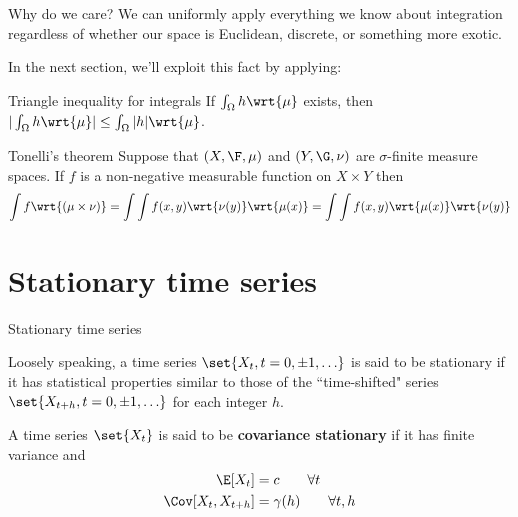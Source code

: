 \documentclass[10pt]{beamer}
\newcommand{\dmu}{\wrt{\mu}}
\begin{document}
\begin{frame}{Why do we care?}
We can uniformly apply everything we know about integration regardless of whether our space is Euclidean, discrete, or something more exotic.

In the next section, we'll exploit this fact by applying:

\vfill 
\begin{block}{Triangle inequality for integrals}
If $\int_\Omega h \dmu$ exists, then $|\int_\Omega h \dmu| \leq \int_\Omega |h| \dmu$.	
\end{block}

\vfill 

\begin{block}{Tonelli's theorem}
 Suppose that $(X,\F,\mu)$ and $(Y, \G, \nu)$ are $\sigma$-finite measure spaces.   If $f$ is a \alert{non-negative} measurable function on $X \times Y$ then
%
\begin{align*}
\int f \wrt{(\mu \times \nu)} = \int \int f(x,y) \wrt{\nu(y)}   \wrt{\mu(x)}  = \int \int f(x,y) \wrt{\mu(x)}  \wrt{\nu(y)}   
\end{align*}
\end{block}
\end{frame}

\section{Stationary time series}

\begin{frame}{Stationary time series}

Loosely speaking, a time series $\set{X_t, t=0, \pm 1, \hdots }$ is said to be \alert{stationary} if it has statistical properties similar to those of the ``time-shifted" series $\set{X_{t+h}, t=0, \pm 1, \hdots}$ for each integer $h$.
\vfill 

\begin{definition}
A time series $\set{X_t}$ is said to be \textbf{covariance stationary}	if it has finite variance and
%
\begin{align*}
\E[X_t] &=c \qquad \forall t \\
\Cov[X_t, X_{t+h}] &= \gamma(h) \qquad \forall t,h
\end{align*}

\end{definition}
\end{frame}
\end{document}

